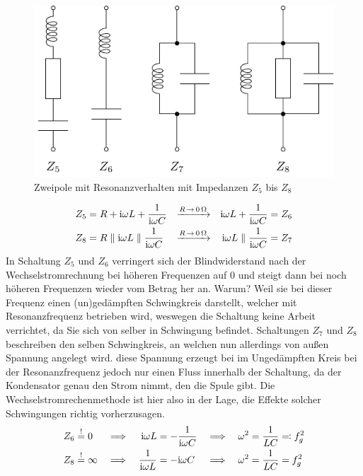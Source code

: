 \begin{figure}[h!]
    \centering
    \includegraphics[scale=1.1]{elektroPhilip2.pdf}
    \caption{Zweipole mit Resonanzverhalten mit Impedanzen $Z_5$ bis $Z_8$}
\end{figure}
%
%
\begin{align*}
    \qquad&&Z_5 &= R + \mathrm{i} \omega L + \frac{1}{\mathrm{i} \omega C} & \xrightarrow{R \,\rightarrow \,\SI{0}{\ohm}} && \mathrm{i} \omega L + \frac{1}{\mathrm{i} \omega C} &= Z_6 
    &&\qquad\\
    \qquad&&Z_8 &= R \parallel \mathrm{i} \omega L \parallel \frac{1}{\mathrm{i} \omega C} & \xrightarrow{R \,\rightarrow \,\SI{0}{\ohm}} && \mathrm{i} \omega L \parallel \frac{1}{\mathrm{i} \omega C} &= Z_7 &&\qquad\\
\end{align*}
In Schaltung $Z_5$ und $Z_6$ verringert sich der Blindwiderstand nach der Wechselstromrechnung bei höheren Frequenzen auf 0 und steigt dann bei noch höheren Frequenzen wieder vom Betrag her an.
Warum? Weil sie bei dieser Frequenz einen (un)gedämpften Schwingkreis darstellt, welcher mit Resonanzfrequenz betrieben wird, weswegen die Schaltung keine Arbeit verrichtet, da Sie sich von selber in Schwingung befindet.
Schaltungen $Z_7$ und $Z_8$ beschreiben den selben Schwingkreis, an welchen nun allerdings von außen 
Spannung angelegt wird. diese Spannung erzeugt bei im Ungedämpften Kreis bei der Resonanzfrequenz jedoch nur einen Fluss innerhalb der Schaltung, da der Kondensator genau den Strom nimmt, den die Spule gibt.
Die Wechselstromrechenmethode ist hier also in der Lage, die Effekte solcher Schwingungen richtig vorherzusagen.
\begin{align*}
    Z_6 &\stackrel{!}{=} 0 &\implies&& \mathrm{i} \omega L &= -\frac{1}{\mathrm{i} \omega C} &\implies&& \omega^2 &= \frac{1}{LC} \eqqcolon f_{g}^2\\
    Z_8 &\stackrel{!}{=} \infty &\implies&& \frac{1}{\mathrm{i} \omega L} &= -\mathrm{i} \omega C &\implies&& \omega^2 &= \frac{1}{LC} = f_{g}^2\\
\end{align*}

